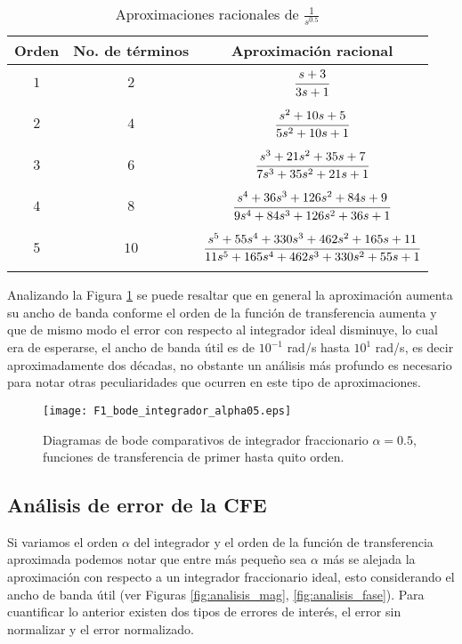 	\begin{table}[!hbp]
		\caption{Aproximaciones racionales de $\frac{1}{s^{0.5}}$}
		\label{tab:aprox_cfe_alpha_0.5}
		\centering
		\begin{tabular}{c c c}
			\hline
			\textbf{Orden} &  \textbf{No. de términos} & \textbf{Aproximación racional}\\
			\hline
			$1$ 		& $2$ 		&  $\cfrac{s + 3}{3s + 1}$\\
					 		& 		 		& \\
			$2$			& $4$ 		&  $\cfrac{s^{2} + 10s + 5}{5 s^{2} + 10s + 1}$\\
							& 		 		& \\
			$3$ 		& $6$ 		&  $\cfrac{s^{3} + 21s^{2} + 35s + 7}{7 s^3 + 35 s^2 + 21 s + 1}$	\\
							& 		 		& \\
			$4$ 		& $8$ 		&  $\cfrac{s^4 + 36 s^3 + 126 s^2 + 84 s + 9}{9 s^4 + 84 s^3 + 126 s^2 + 36 s + 1}$\\
							& 		 		& \\
			$5$ 		& $10$ 		&  $\cfrac{s^5 + 55 s^4 + 330 s^3 + 462 s^2 + 165 s + 11}{11 s^5 + 165 s^4 + 462 s^3 + 330 s^2 + 55 s + 1}$\\
							& 		 		& \\
			\hline
		\end{tabular}
	\end{table}
	
	Analizando la Figura \ref{fig:F1_bode_integrador_alpha05} se puede resaltar que en general la aproximación aumenta su ancho de banda conforme el orden de la función de transferencia aumenta y que de mismo modo el error con respecto al integrador ideal disminuye, lo cual era de esperarse, el ancho de banda útil es de $10^{-1}$ rad/s hasta $10^{1}$ rad/s, es decir aproximadamente dos décadas, no obstante un análisis más profundo es necesario para notar otras peculiaridades que ocurren en este tipo de aproximaciones.
	
	\begin{figure}[hbtp]
		\caption{Diagramas de bode comparativos de integrador fraccionario $\alpha = 0.5$, funciones de transferencia de primer hasta quito orden.} 
		\label{fig:F1_bode_integrador_alpha05}
		\centering
		\texttt{[image: F1\_bode\_integrador\_alpha05.eps]}
	\end{figure}
	
	\subsection{Análisis de error de la CFE}
	Si variamos el orden $\alpha$ del integrador y el orden de la función de transferencia aproximada podemos notar que entre más pequeño sea $\alpha$ más se alejada la aproximación con respecto a un integrador fraccionario ideal, esto considerando el ancho de banda útil (ver Figuras \ref{fig:analisis_mag}, \ref{fig:analisis_fase}). Para cuantificar lo anterior existen dos tipos de errores de interés, el error sin normalizar y el error normalizado.
	
